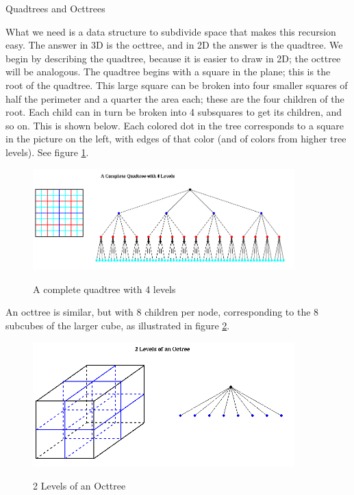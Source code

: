  {Quadtrees and Octtrees}
\label{sec:bh-trees}

What we need is a data structure to subdivide space that makes this recursion
easy. The answer in 3D is the octtree, and in 2D the answer is the quadtree. We
begin by describing the quadtree, because it is easier to draw in 2D; the
octtree will be analogous. The quadtree begins with a square in the plane; this
is the root of the quadtree. This large square can be broken into four smaller
squares of half the perimeter and a quarter the area each; these are the four
children of the root. Each child can in turn be broken into 4 subsquares to get
its children, and so on. This is shown below. Each colored dot in the tree
corresponds to a square in the picture on the left, with edges of that color
(and of colors from higher tree levels). See figure \ref{fig:bh-Quadtree1}.

\begin{figure}[!htbp]
  \centering
  \includegraphics[width=0.9\textwidth]{graphics/bh/Quadtree1.png}
  \label{fig:bh-Quadtree1}
  \caption{A complete quadtree with 4 levels}
\end{figure}

An octtree is similar, but with 8 children per node, corresponding to the 8
subcubes of the larger cube, as illustrated in figure \ref{fig:bh-Octtree}.

\begin{figure}[!htbp]
  \centering
  \includegraphics[width=0.9\textwidth]{graphics/bh/Octtree.png}
  \label{fig:bh-Octtree}
  \caption{2 Levels of an Octtree}
\end{figure}


